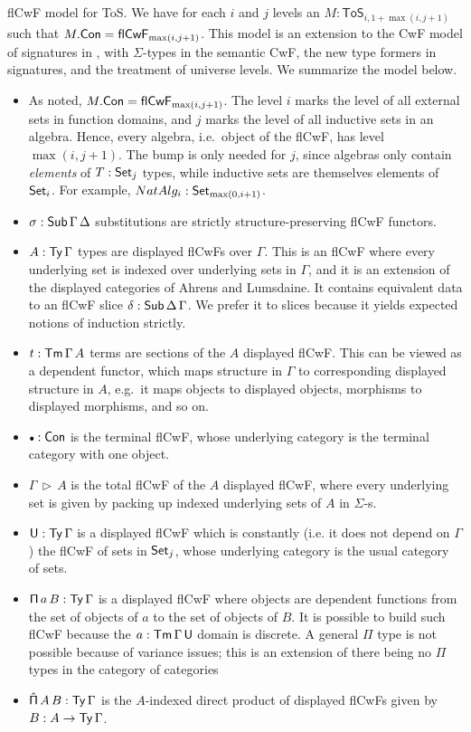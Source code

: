 \documentclass{llncs}
\newcommand{\ToS}{\mathsf{ToS}}
\newcommand{\ext}{\triangleright}
\newcommand{\emptycon}{\scaleobj{.75}\bullet}
\newcommand{\Pii}{\mathsf{\Pi}}
\newcommand{\Pie}{\mathsf{\hat{\Pi}}}
\newcommand{\flCwF}{\mathsf{flCwF}}
\begin{document}
\begin{nidefinition}{flCwF model for ToS.} We have for each $i$ and $j$ levels
an $M : \ToS_{i, 1+\max(i,j+1)}$ such that $M.\Con = \flCwF_{\max(i,j+1)}$. This
model is an extension to the CwF model of signatures in \cite{TODO}, with
$\Sigma$-types in the semantic CwF, the new type formers in signatures, and the
treatment of universe levels. We summarize the model below.
\begin{itemize}
\item As noted, $M.\Con = \flCwF_{\max(i,j+1)}$. The level $i$ marks the level of
      all external sets in function domains, and $j$ marks the level of all inductive
      sets in an algebra. Hence, every algebra, i.e.\ object of the flCwF, has
      level $\max(i,j+1)$. The bump is only needed for $j$, since algebras only contain
      \emph{elements} of $T : \mathsf{Set}_j$ types, while inductive sets are themselves elements
      of $\mathsf{Set}_i$. For example, $NatAlg_i : \mathsf{Set}_{\max(0, i+1)}$.
\item $\sigma : \mathsf{Sub}\,\Gamma\,\Delta$ substitutions are strictly structure-preserving flCwF
      functors.
    \item $A : \mathsf{Ty}\,\Gamma$ types are displayed flCwFs over $\Gamma$. This is an
      flCwF where every underlying set is indexed over underlying sets in
      $\Gamma$, and it is an extension of the displayed categories of Ahrens and
      Lumsdaine\cite{TODO}.  It contains equivalent data to an flCwF slice
      $\delta : \mathsf{Sub}\,\Delta\,\Gamma$. We prefer it to slices because it yields
      expected notions of induction strictly.
\item $t : \mathsf{Tm}\,\Gamma\,A$ terms are sections of the $A$ displayed flCwF. This can be viewed
      as a dependent functor, which maps structure in $\Gamma$ to corresponding displayed
      structure in $A$, e.g.\ it maps objects to displayed objects, morphisms to displayed
      morphisms, and so on.
\item $\emptycon : \Con$ is the terminal flCwF, whose underlying category is the terminal
      category with one object.

\item $\Gamma\,\ext\,A$ is the total flCwF of the $A$ displayed flCwF, where every underlying
      set is given by packing up indexed underlying sets of $A$ in $\Sigma$-s.

\item $\mathsf{U} : \mathsf{Ty}\,\Gamma$ is a displayed flCwF which is constantly (i.e. it does
      not depend on $\Gamma$) the flCwF of sets in $\mathsf{Set}_j$, whose underlying category
      is the usual category of sets.
\item
  $\Pii\,a\,B : \Ty\,\Gamma$ is a displayed flCwF where objects are
  dependent functions from the set of objects of $a$ to the set of objects of
  $B$. It is possible to build such flCwF because the $a : \mathsf{Tm}\,\Gamma\,\mathsf{U}$
  domain is discrete. A general $\Pii$ type is not possible because of variance
  issues; this is an extension of there being no $\Pii$ types in the category
  of categories\cite{elephant}
\item
  $\Pie\,A\,B : \Ty\,\Gamma$ is the $A$-indexed direct product of displayed flCwFs
  given by $B : A \rightarrow \mathsf{Ty}\,\Gamma$.


\end{itemize}
\end{nidefinition}
\end{document}

